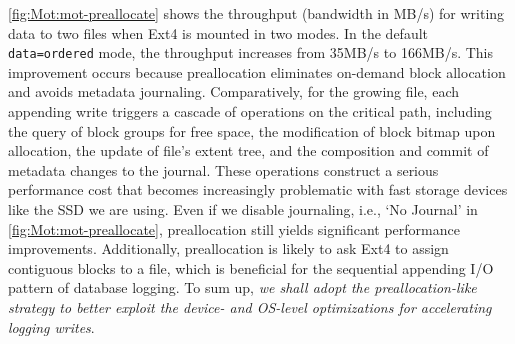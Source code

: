 \autoref{fig:Mot:mot-preallocate} shows the throughput (bandwidth in MB/s) 
for writing data to two files when Ext4 is mounted in two modes. 
In the default \texttt{data=ordered} mode,  
the   throughput increases from 35MB/s to 166MB/s.
%
This improvement occurs because preallocation eliminates on-demand block allocation 
and avoids metadata journaling. %
%
%
Comparatively, for the growing file,
each appending write   triggers a cascade of  operations on the critical path, including the query of block groups for free space,
the modification of block bitmap upon allocation,  the update of file's extent tree, 
and the composition and commit of metadata changes to the journal.
These operations   construct a serious performance cost that becomes increasingly problematic with fast storage devices like the  SSD we are using.
Even if we disable   journaling, i.e., `No Journal' in \autoref{fig:Mot:mot-preallocate},
preallocation still yields   significant performance improvements. Additionally, 
preallocation is likely to ask Ext4 to assign contiguous blocks to a file,
which is
 beneficial for the sequential appending I/O pattern of database logging. 
To sum up,
 {\em we shall adopt the preallocation-like strategy 	to better exploit the	device- and OS-level optimizations
for accelerating   logging writes}.

